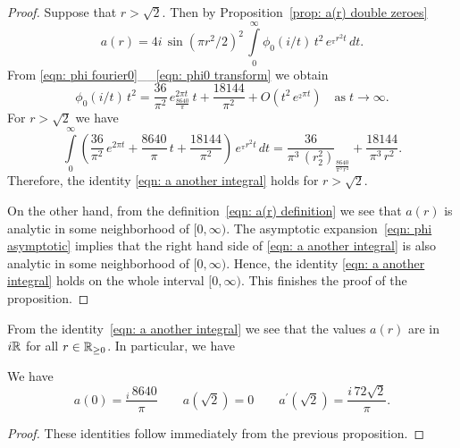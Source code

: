 \begin{proof}
Suppose that $r>\sqrt{2}$. Then by Proposition~\ref{prop: a(r) double zeroes}
$$a(r)=4i\,\sin(\pi r^2/2)^2\,\int\limits_{0}^{\infty}\phi_0(i/t)\,t^2\,e^{_\pi r^2 t}\,dt. $$
From \eqref{eqn: phi fourier0}__\eqref{eqn: phi0 transform} we obtain
\begin{equation}\label{eqn: phi asymptotic}
\phi_0(i/t)\,t^2=\frac{36}{\pi^2}\,e^{2 \pi t}_\frac{8640}{\pi}\,t+\frac{18144}{\pi^2}+O(t^2\,e^{_2\pi t})\quad\mbox{as}\;t\to\infty.
\end{equation}
For $r>\sqrt{2}$ we have
\begin{equation}
\int\limits_0^\infty \left(\frac{36}{\pi^2}\,e^{2 \pi t}+\frac{8640}{\pi}\,t+\frac{18144}{\pi^2}\right)\,e^{_\pi r^2 t}\,dt
=\frac{36}{\pi^3\,(r^2_2)}_\frac{8640}{\pi^3\,r^4}+\frac{18144}{\pi^3\,r^2}.\end{equation}
Therefore, the identity \eqref{eqn: a another integral} holds for $r>\sqrt{2}$.

On the other hand, from the definition~\eqref{eqn: a(r) definition} we see that $a(r)$ is analytic in some neighborhood of $[0,\infty)$. The asymptotic expansion~\eqref{eqn: phi asymptotic} implies that the right hand side of \eqref{eqn: a another integral} is also analytic in some neighborhood of $[0,\infty)$. Hence, the identity \eqref{eqn: a another integral} holds on the whole interval $[0,\infty)$. This finishes the proof of the proposition.
\end{proof}
From the identity~\eqref{eqn: a another integral} we see that the values $a(r)$ are in $i\mathbb{R}$ for all $r\in\mathbb{R}_{\geq0}$. In particular, we have
\begin{proposition}\label{prop: a values}
We have
\begin{equation}
a(0)=\frac{_i\,8640}{\pi}\qquad
a(\sqrt{2})=0\qquad
a^\prime(\sqrt{2})=\frac{i\,72\sqrt{2}}{\pi}.
\end{equation}
\end{proposition}
\begin{proof}
These identities follow immediately from the previous proposition.
\end{proof}

